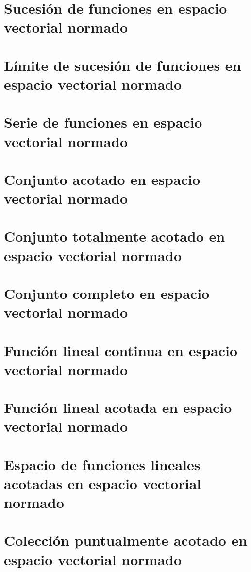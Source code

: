 \section{Sucesión de funciones en espacio vectorial normado}

\section{Límite de sucesión de funciones en espacio vectorial normado}

\section{Serie de funciones en espacio vectorial normado}

\section{Conjunto acotado en espacio vectorial normado}

\section{Conjunto totalmente acotado en espacio vectorial normado}

\section{Conjunto completo en espacio vectorial normado}

\section{Función lineal continua en espacio vectorial normado}

\section{Función lineal acotada en espacio vectorial normado}

\section{Espacio de funciones lineales acotadas en espacio vectorial normado}

\section{Colección puntualmente acotado en espacio vectorial normado}


